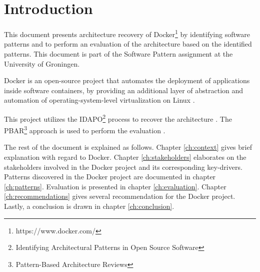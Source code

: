 \clearpage
\chapter{Introduction}
\label{ch:introduction}
This document presents architecture recovery of Docker\footnote{https://www.docker.com/} by identifying software patterns and to perform an evaluation of the architecture based on the identified patterns. This document is part of the Software Pattern assignment at the University of Groningen.

Docker is an open-source project that automates the deployment of applications inside software containers, by providing an additional layer of abstraction and automation of operating-system-level virtualization on Linux \cite{dockerdef}. 

This project utilizes the IDAPO\footnote{Identifying Architectural Patterns in Open Source Software} process to recover the architecture \cite{idapo}. The PBAR\footnote{Pattern-Based Architecture Reviews} approach is used to perform the evaluation \cite{pbar}.




The rest of the document is explained as follows. Chapter \ref{ch:context} gives brief explanation with regard to Docker. Chapter \ref{ch:stakeholders} elaborates on the stakeholders involved in the Docker project and its corresponding key-drivers. Patterns discovered in the Docker project are documented in chapter \ref{ch:patterns}. Evaluation is presented in chapter \ref{ch:evaluation}. Chapter \ref{ch:recommendations} gives several recommendation for the Docker project. Lastly, a conclusion is drawn in chapter \ref{ch:conclusion}.